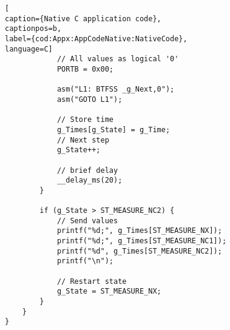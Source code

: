 \begin{lstlisting}[
caption={Native C application code},
captionpos=b,
label={cod:Appx:AppCodeNative:NativeCode},
language=C]
            // All values as logical '0'
            PORTB = 0x00;

            asm("L1: BTFSS _g_Next,0");
            asm("GOTO L1");

            // Store time
            g_Times[g_State] = g_Time;
            // Next step
            g_State++;

            // brief delay
            __delay_ms(20);
        }

        if (g_State > ST_MEASURE_NC2) {
            // Send values
            printf("%d;", g_Times[ST_MEASURE_NX]);
            printf("%d;", g_Times[ST_MEASURE_NC1]);
            printf("%d", g_Times[ST_MEASURE_NC2]);
            printf("\n");

            // Restart state
            g_State = ST_MEASURE_NX;
        }
    }
}

\end{lstlisting}
\medskip

